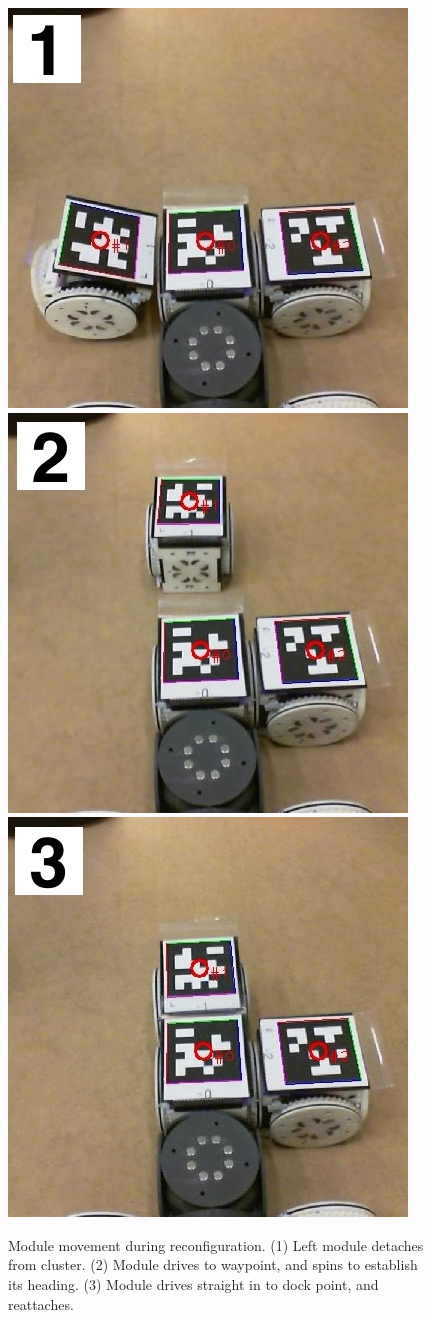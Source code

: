 \documentclass[journal]{IEEEtran}
\begin{document}
\begin{figure}[t]
\begin{center}
  \includegraphics[width=0.32\columnwidth]{images/reconf_detach.jpg}
  \includegraphics[width=0.32\columnwidth]{images/reconf_waypoint.jpg}
  \includegraphics[width=0.32\columnwidth]{images/reconf_attach.jpg}
  \caption{Module movement during reconfiguration. (1) Left module detaches from cluster. (2) Module drives to waypoint, and spins to establish its heading. (3) Module drives straight in to dock point, and reattaches.}
  \label{fig:reconf}
\end{center}
\end{figure}

\end{document}
